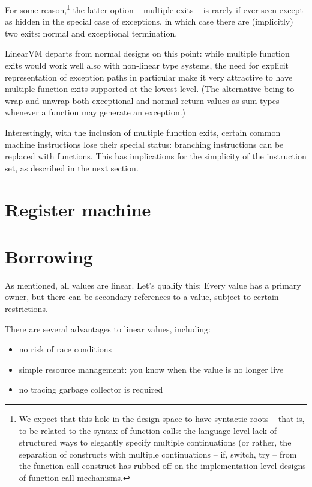 \documentclass[a4paper]{book}
\begin{document}
For some reason,\footnote{
  We expect that this hole in the design space to have syntactic roots
  -- that is, to be related to the syntax of function calls:
  the language-level lack of structured ways to elegantly specify
  multiple continuations (or rather, the separation of constructs with
  multiple continuations -- if, switch, try -- from the function call
  construct has rubbed off
  on the implementation-level designs of function call mechanisms.
} the latter option -- multiple exits -- is rarely if
ever seen except as hidden in the special case of exceptions, in which
case there are (implicitly) two exits: normal and exceptional termination.

LinearVM departs from normal designs on this point: while multiple
function exits would work well also with non-linear type systems,
the need for explicit representation of exception paths in particular
make it very attractive to have multiple function exits supported at the
lowest level.
(The alternative being to wrap and unwrap both exceptional and normal
return values as sum types whenever a function may generate an exception.)

\smallskip
Interestingly, with the inclusion of multiple function exits, certain
common machine instructions lose their special status: branching instructions
can be replaced with functions. This has implications for the
simplicity of the instruction set, as described in the next section.

\section{Register machine}


\section{Borrowing}
\label{sec:design-borrowing}
As mentioned, all values are linear.  Let's qualify this: Every value
has a primary owner, but there can be secondary references to a value,
subject to certain restrictions.

There are several advantages to linear values, including:
\begin{itemize}
\item no risk of race conditions
\item simple resource management: you know when the value is no longer live
\item no tracing garbage collector is required
\end{itemize}
\end{document}
